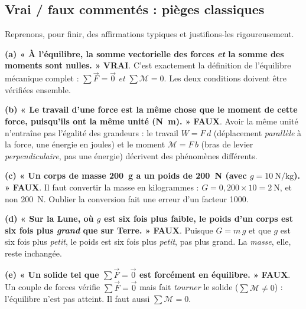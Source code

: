 \documentclass[11pt,a4paper]{article}
\newcommand{\vv}[1]{\vec{#1}}
\newcommand{\Mom}{\mathcal{M}}      %
\begin{document}
\subsection{Vrai / faux commentés : pièges classiques}
\begin{exemple}
Reprenons, pour finir, des affirmations typiques et justifions-les rigoureusement.

\smallskip
\textbf{(a) « À l'équilibre, la somme vectorielle des forces \emph{et} la somme des moments sont
nulles. »} \quad\textbf{VRAI}. C'est exactement la définition de l'équilibre mécanique complet :
$\sum\vv F = \vv 0$ \emph{et} $\sum\Mom = 0$. Les deux conditions doivent être vérifiées ensemble.

\smallskip
\textbf{(b) « Le travail d'une force est la même chose que le moment de cette force, puisqu'ils ont
la même unité (\si{\newton\metre}). »} \quad\textbf{FAUX}. Avoir la même unité n'entraîne pas l'égalité
des grandeurs : le travail $W=F\,d$ (déplacement \emph{parallèle} à la force, une énergie en joules)
et le moment $\Mom = F\,b$ (bras de levier \emph{perpendiculaire}, pas une énergie) décrivent des
phénomènes différents.

\smallskip
\textbf{(c) « Un corps de masse \SI{200}{\gram} a un poids de \SI{200}{\newton} (avec
$g=\SI{10}{\newton\per\kilogram}$). »} \quad\textbf{FAUX}. Il faut convertir la masse en kilogrammes :
$G = 0{,}200\times 10 = \SI{2}{\newton}$, et non \SI{200}{\newton}. Oublier la conversion fait une
erreur d'un facteur 1000.

\smallskip
\textbf{(d) « Sur la Lune, où $g$ est six fois plus faible, le poids d'un corps est six fois plus
\emph{grand} que sur Terre. »} \quad\textbf{FAUX}. Puisque $G=m\,g$ et que $g$ est six fois plus
\emph{petit}, le poids est six fois plus \emph{petit}, pas plus grand. La \emph{masse}, elle, reste
inchangée.

\smallskip
\textbf{(e) « Un solide tel que $\sum\vv F=\vv 0$ est forcément en équilibre. »} \quad\textbf{FAUX}.
Un couple de forces vérifie $\sum\vv F=\vv 0$ mais fait \emph{tourner} le solide ($\sum\Mom\neq 0$) :
l'équilibre n'est pas atteint. Il faut aussi $\sum\Mom = 0$.
\end{exemple}

\end{document}
